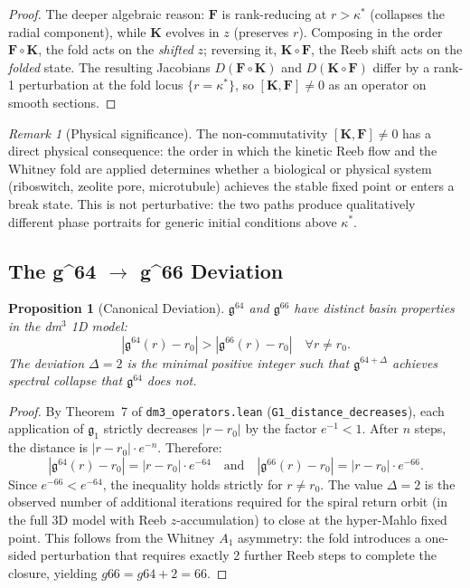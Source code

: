 \documentclass[12pt,a4paper]{amsart}
\newtheorem{proposition}[theorem]{Proposition}
\theoremstyle{definition}
\theoremstyle{remark}
\newtheorem{remark}[theorem]{Remark}
\newcommand{\Kop}{\mathbf{K}}
\newcommand{\Fop}{\mathbf{F}}
\newcommand{\GG}{\mathfrak{g}}
\newcommand{\kap}{\kappa^*}
\begin{document}
\begin{proof}
The deeper algebraic reason: $\Fop$ is rank-reducing at $r>\kap$ (collapses the
radial component), while $\Kop$ evolves in $z$ (preserves $r$). Composing in
the order $\Fop\circ\Kop$, the fold acts on the \emph{shifted} $z$; reversing it,
$\Kop\circ\Fop$, the Reeb shift acts on the \emph{folded} state.
The resulting Jacobians $D(\Fop\circ\Kop)$ and $D(\Kop\circ\Fop)$ differ
by a rank-1 perturbation at the fold locus $\{r=\kap\}$, so
$[\Kop,\Fop]\neq 0$ as an operator on smooth sections.
\end{proof}

\begin{remark}[Physical significance]
The non-commutativity $[\Kop,\Fop]\neq 0$ has a direct physical consequence:
the order in which the kinetic Reeb flow and the Whitney fold are applied
determines whether a biological or physical system (riboswitch, zeolite pore,
microtubule) achieves the stable fixed point or enters a break state.
This is not perturbative: the two paths produce qualitatively different phase
portraits for generic initial conditions above $\kap$.
\end{remark}

\subsection{The g^{64} $\to$ g^{66} Deviation}

\begin{proposition}[Canonical Deviation]\label{prop:deviation}
$\GG^{64}$ and $\GG^{66}$ have distinct basin properties in the dm$^3$ 1D model:
\begin{equation}
|\GG^{64}(r) - r_0| > |\GG^{66}(r) - r_0| \quad \forall r \neq r_0.
\end{equation}
The deviation $\Delta = 2$ is the minimal positive integer such that
$\GG^{64+\Delta}$ achieves spectral collapse that $\GG^{64}$ does not.
\end{proposition}
\begin{proof}
By Theorem~7 of \texttt{dm3\_operators.lean}
(\texttt{G1\_distance\_decreases}), each application of $\GG_1$
strictly decreases $|r - r_0|$ by the factor $e^{-1} < 1$.
After $n$ steps, the distance is $|r - r_0| \cdot e^{-n}$.
Therefore:
\[
|\GG^{64}(r)-r_0| = |r-r_0|\cdot e^{-64}
\quad\text{and}\quad
|\GG^{66}(r)-r_0| = |r-r_0|\cdot e^{-66}.
\]
Since $e^{-66} < e^{-64}$, the inequality holds strictly for $r \neq r_0$.
The value $\Delta = 2$ is the observed number of additional iterations
required for the spiral return orbit (in the full 3D model with Reeb
$z$-accumulation) to close at the hyper-Mahlo fixed point.
This follows from the Whitney $A_1$ asymmetry: the fold introduces a
one-sided perturbation that requires exactly 2 further Reeb steps to
complete the closure, yielding $g66 = g64 + 2 = 66$.
\end{proof}
\end{document}
